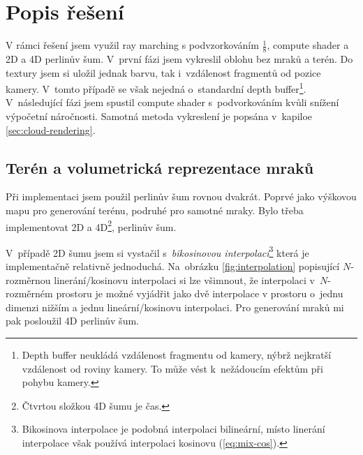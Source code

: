 \documentclass[a4paper, 12pt]{article}
\begin{document}

\section{Popis řešení}

%

V rámci řešení jsem využil ray marching s podvzorkováním $\frac{1}{8}$,
compute shader a 2D a 4D perlinův šum.
V~první fázi jsem vykreslil oblohu bez mraků a terén. Do textury jsem
si uložil jednak barvu, tak i~vzdálenost fragmentů od pozice kamery. V~tomto
případě se však nejedná o~standardní depth buffer\footnote{
Depth buffer neukládá vzdálenost fragmentu od kamery, nýbrž
nejkratší vzdálenost od roviny kamery. To může vést k~nežádoucím efektům
při pohybu kamery.}.
V~následující fázi jsem spustil compute shader s~podvorkováním kvůli snížení
výpočetní náročnosti. Samotná metoda vykreslení je popsána v~kapiloe \ref{sec:cloud-rendering}.

\subsection{Terén a volumetrická reprezentace mraků}

Při implementaci jsem použil perlinův šum rovnou dvakrát.
Poprvé jako výškovou mapu pro generování terénu, podruhé pro samotné mraky.
Bylo třeba implementovat 2D a 4D\footnote{Čtvrtou složkou 4D šumu je čas.},
perlinův šum.

V~případě 2D šumu jsem si vystačil s~\textit{bikosinovou interpolací}\footnote{
Bikosinova interpolace je podobná interpolaci bilineární, místo
linerání interpolace však používá interpolaci kosinovu (\ref{eq:mix-cos}).
}
která je implementačně relativně jednoduchá. Na~obrázku \ref{fig:interpolation}
popisující $N$-rozměrnou linerání/kosinovu interpolaci si lze všimnout,
že interpolaci v~$N$-rozměrném prostoru je možné vyjádřit jako dvě interpolace
v prostoru o~jednu dimenzi nižším a jednu lineární/kosinovu interpolaci.
Pro generování mraků mi pak posloužil 4D perlinův šum.
\end{document}
